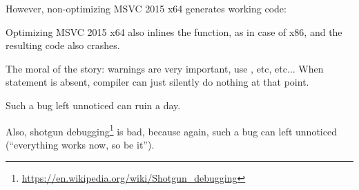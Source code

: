

However, non-optimizing MSVC 2015 x64 generates working code:



Optimizing MSVC 2015 x64 also inlines the function, as in case of x86, and the resulting code also crashes.

The moral of the story: warnings are very important, use , etc, etc...
When  statement is absent, compiler can just silently do nothing at that point.

Such a bug left unnoticed can ruin a day.

Also, shotgun debugging\footnote{\url{https://en.wikipedia.org/wiki/Shotgun_debugging}}
is bad, because again, such a bug can left unnoticed (``everything works now, so be it'').

